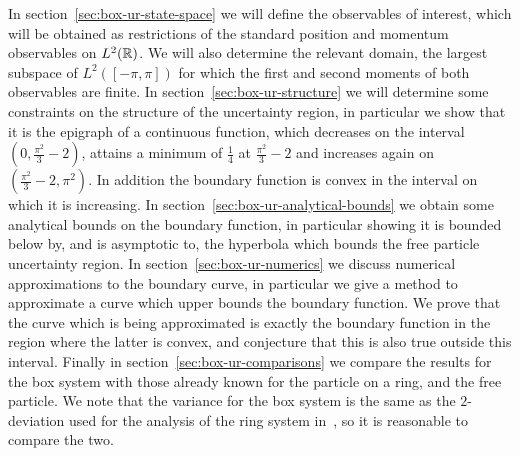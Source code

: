 In section~\ref{sec:box-ur-state-space} we will define the observables of interest, which will be obtained as restrictions of the standard position and momentum observables on $L^2(\mathbb{R})$. We will also determine the relevant domain, the largest subspace of $L^2([-\pi,\pi])$ for which the first and second moments of both observables are finite. In section~\ref{sec:box-ur-structure} we will determine some constraints on the structure of the uncertainty region, in particular we show that it is the epigraph of a continuous function, which decreases on the interval $\left(0,\frac{\pi^2}{3}-2\right)$, attains a minimum of $\frac{1}{4}$ at $\frac{\pi^2}{3}-2$ and increases again on $\left(\frac{\pi^2}{3}-2, \pi^2\right)$. In addition the boundary function is convex in the interval on which it is increasing. In section~\ref{sec:box-ur-analytical-bounds} we obtain some analytical bounds on the boundary function, in particular showing it is bounded below by, and is asymptotic to, the hyperbola which bounds the free particle uncertainty region. In section~\ref{sec:box-ur-numerics} we discuss numerical approximations to the boundary curve, in particular we give a method to approximate a curve which upper bounds the boundary function. We prove that the curve which is being approximated is exactly the boundary function in the region where the latter is convex, and conjecture that this is also true outside this interval. Finally in section~\ref{sec:box-ur-comparisons} we compare the results for the box system with those already known for the particle on a ring, and the free particle. We note that the variance for the box system is the same as the $2$-deviation used for the analysis of the ring system in~\cite{sharp-ur-num-angle}, so it is reasonable to compare the two.


